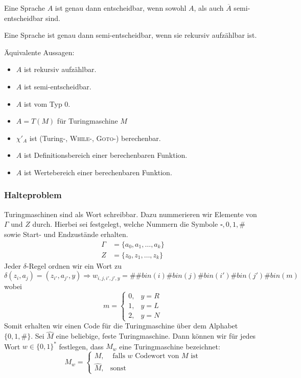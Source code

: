 \documentclass{scrartcl}
\begin{document}
\begin{center}
\scalebox{0.75}{}
\end{center}

\begin{shaded}
    Eine Sprache $A$ ist genau dann entscheidbar, wenn sowohl $A$, als auch $\overline{A}$ semi-entscheidbar sind.
\end{shaded}
\begin{shaded}
    Eine Sprache ist genau dann semi-entscheidbar, wenn sie rekursiv aufzählbar ist.
\end{shaded}

Äquivalente Aussagen:
\begin{itemize}
    \item $A$ ist rekursiv aufzählbar.
    \item $A$ ist semi-entscheidbar.
    \item $A$ ist vom Typ 0.
    \item $A=T(M)$ für Turingmaschine $M$
    \item $\chi'_A$ ist (Turing-, \textsc{While}-, \textsc{Goto-}) berechenbar.
    \item $A$ ist Definitionsbereich einer berechenbaren Funktion.
    \item $A$ ist Wertebereich einer berechenbaren Funktion.
\end{itemize}

\subsubsection*{Halteproblem}
Turingmaschinen sind als Wort schreibbar. Dazu nummerieren wir Elemente von $\Gamma$ und $Z$ durch. Hierbei sei festgelegt, welche Nummern die Symbole $\square,0,1,\#$ sowie Start- und Endzustände erhalten.
\begin{align*}
\Gamma &= \{a_0,a_1,\dots,a_k\} \\
Z &= \{z_0,z_1,\dots,z_k\}
\end{align*}
Jeder $\delta$-Regel ordnen wir ein Wort zu
\[
\delta(z_i,a_j) = (z_{i'},a_{j'},y)
\Rightarrow w_{i,j,i',j',y} = \#\#bin(i)\#bin(j)\#bin(i')\#bin(j')\#bin(m)
\]
wobei
\[
m=
\begin{cases}
    0, & y=R \\
    1, & y=L \\
    2, & y=N
\end{cases}
\]
Somit erhalten wir einen Code für die Turingmaschine über dem Alphabet $\{0,1,\#\}$. Sei $\hat M$ eine beliebige, feste Turingmaschine. Dann können wir für jedes Wort $w\in\{0,1\}^*$ festlegen, dass $M_w$ eine Turingmaschine bezeichnet:
\[
M_w=
\begin{cases}
    M, &\text{ falls } w \textrm{ Codewort von } M \textrm{ ist}\\
    \hat M, & \textrm{sonst}
\end{cases}
\]
\end{document}
